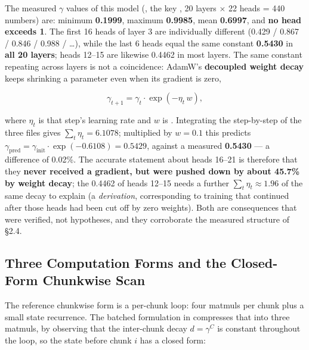 \documentclass[11pt,openany]{article}
\begin{document}
The measured $\gamma$ values of this model
(\linebreak[0]\linebreak[0]\linebreak[0]\linebreak[0], the key \linebreak[0],
20 layers $\times$ 22 heads = 440 numbers) are: minimum \textbf{0.1999}, maximum \textbf{0.9985},
mean \textbf{0.6997}, and \textbf{no head exceeds 1}. The first 16 heads of layer 3 are
individually different (0.429 / 0.867 / 0.846 / 0.988 / \dots), while the last 6 heads equal the
same constant \textbf{0.5430} in \textbf{all 20 layers}; heads 12--15 are likewise 0.4462 in most
layers. The same constant repeating across layers is not a coincidence: AdamW's \textbf{decoupled
weight decay} keeps shrinking a parameter even when its gradient is zero,

\[
\gamma_{t+1}=\gamma_t\cdot\exp(-\eta_t\,w),
\]

where $\eta_t$ is that step's learning rate and $w$ is \linebreak[0]. Integrating the
step-by-step \linebreak[0] of the three \linebreak[0] files gives
$\sum_t\eta_t=6.1078$; multiplied by $w=0.1$ this predicts
$\gamma_{\text{pred}}=\gamma_{\text{init}}\cdot\exp(-0.6108)=0.5429$, against a measured
\textbf{0.5430} --- a difference of 0.02\%. The accurate statement about heads 16--21 is therefore
that they \textbf{never received a gradient, but were pushed down by about 45.7\% by weight
decay}; the 0.4462 of heads 12--15 needs a further $\sum_t\eta_t\approx1.96$ of the same decay to
explain (a \emph{derivation}, corresponding to training that continued after those heads had been
cut off by zero weights). Both are consequences that were verified, not hypotheses, and they
corroborate the measured structure of \S2.4.

\subsection{Three Computation Forms and the Closed-Form Chunkwise Scan}

The reference chunkwise form is a per-chunk loop: four matmuls per chunk plus a small state
recurrence. The batched formulation in \linebreak[0]\linebreak[0] compresses that into
three matmuls, by observing that the inter-chunk decay $d=\gamma^{C}$ is constant throughout the
loop, so the state before chunk $i$ has a closed form:
\end{document}
